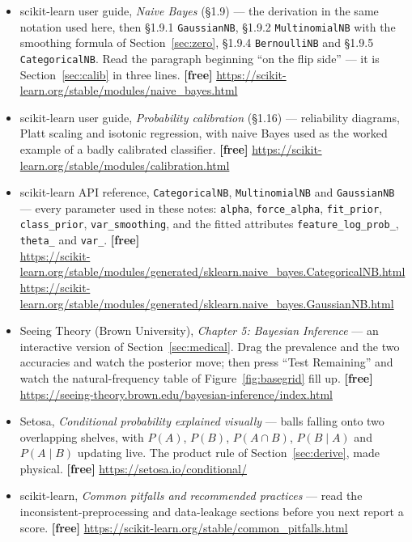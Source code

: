\documentclass[11pt]{article}
\begin{document}
\begin{itemize}[leftmargin=*]
  \item scikit-learn user guide, \emph{Naive Bayes} (\S1.9) --- the
    derivation in the same notation used here, then \S1.9.1
    \texttt{GaussianNB}, \S1.9.2 \texttt{MultinomialNB} with the smoothing
    formula of Section~\ref{sec:zero}, \S1.9.4 \texttt{BernoulliNB} and
    \S1.9.5 \texttt{CategoricalNB}. Read the paragraph beginning ``on the
    flip side'' --- it is Section~\ref{sec:calib} in three lines.
    \textbf{[free]} \url{https://scikit-learn.org/stable/modules/naive_bayes.html}
  \item scikit-learn user guide, \emph{Probability calibration} (\S1.16) ---
    reliability diagrams, Platt scaling and isotonic regression, with naive
    Bayes used as the worked example of a badly calibrated classifier.
    \textbf{[free]}
    \url{https://scikit-learn.org/stable/modules/calibration.html}
  \item scikit-learn API reference, \texttt{CategoricalNB},
    \texttt{MultinomialNB} and \texttt{GaussianNB} --- every parameter used
    in these notes: \texttt{alpha}, \texttt{force\_alpha},
    \texttt{fit\_prior}, \texttt{class\_prior}, \texttt{var\_smoothing}, and
    the fitted attributes \texttt{feature\_log\_prob\_}, \texttt{theta\_} and
    \texttt{var\_}. \textbf{[free]}\\
    \url{https://scikit-learn.org/stable/modules/generated/sklearn.naive_bayes.CategoricalNB.html}\\
    \url{https://scikit-learn.org/stable/modules/generated/sklearn.naive_bayes.GaussianNB.html}
  \item Seeing Theory (Brown University), \emph{Chapter 5: Bayesian
    Inference} --- an interactive version of Section~\ref{sec:medical}. Drag
    the prevalence and the two accuracies and watch the posterior move; then
    press ``Test Remaining'' and watch the natural-frequency table of
    Figure~\ref{fig:basegrid} fill up. \textbf{[free]}
    \url{https://seeing-theory.brown.edu/bayesian-inference/index.html}
  \item Setosa, \emph{Conditional probability explained visually} --- balls
    falling onto two overlapping shelves, with $P(A)$, $P(B)$,
    $P(A \cap B)$, $P(B \mid A)$ and $P(A \mid B)$ updating live. The
    product rule of Section~\ref{sec:derive}, made physical.
    \textbf{[free]} \url{https://setosa.io/conditional/}
  \item scikit-learn, \emph{Common pitfalls and recommended practices} ---
    read the inconsistent-preprocessing and data-leakage sections before you
    next report a score. \textbf{[free]}
    \url{https://scikit-learn.org/stable/common_pitfalls.html}
\end{itemize}
\end{document}
